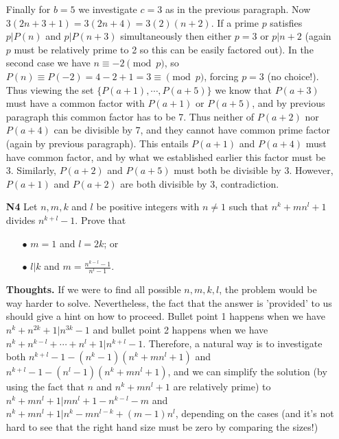 \documentclass[11pt,a4paper]{article}
\begin{document}
\begin{itemize}
Finally for $b=5$ we investigate $c=3$ as in the previous paragraph. 
Now $3(2n+3+1)=3(2n+4)=3(2)(n+2)$. 
If a prime $p$ satisfies $p|P(n)$ and $p|P(n+3)$ simultaneously then either $p=3$ or $p|n+2$ 
(again $p$ must be relatively prime to 2 so this can be easily factored out). 
In the second case we have $n\equiv -2\pmod{p}$, 
so $P(n)\equiv P(-2)=4-2+1=3\equiv\pmod{p}$, forcing $p=3$ (no choice!). 
Thus viewing the set $\{P(a+1), \cdots , P(a+5)\}$ 
we know that $P(a+3)$ must have a common factor with $P(a+1)$ or $P(a+5)$, and by previous paragraph this common factor has to be 7. 
Thus neither of $P(a+2)$ nor $P(a+4)$ can be divisible by 7, and they cannot have common prime factor (again by previous paragraph). 
This entails $P(a+1)$ and $P(a+4)$ must have common factor, and by what we established earlier this factor must be 3. 
Similarly, $P(a+2)$ and $P(a+5)$ must both be divisible by 3. 
However, $P(a+1)$ and $P(a+2)$ are both divisible by 3, contradiction. 


\newpage

\item[\textbf{N4}]
Let $n, m, k$ and $l$ be positive integers with $n \neq 1$ such that $n^k + mn^l + 1$ divides $n^{k+l} - 1$. Prove that
\begin{itemize}
\item[$\bullet$] $m = 1$ and $l = 2k$; or
\item[$\bullet$] $l|k$ and $m = \frac{n^{k-l}-1}{n^l-1}$.
\end{itemize}

\textbf{Thoughts.} If we were to find all possible $n, m , k , l$, the problem would be way harder to solve. Nevertheless, the fact that the answer is 'provided' to us should give a hint on how to proceed. Bullet point 1 happens when we have $n^k+n^{2k}+1|n^{3k}-1$ and bullet point 2 happens when we have $n^k+n^{k-l}+\cdots +n^l+1|n^{k+l}-1$. Therefore, a natural way is to investigate both $n^{k+l}-1-(n^k-1)(n^k+mn^l+1)$ and $n^{k+l}-1-(n^l-1)(n^k+mn^l+1)$, and we can simplify the solution (by using the fact that $n$ and $n^k+mn^l+1$ are relatively prime) to $n^k+mn^l+1|mn^{l}+1-n^{k-l}-m$ and $n^k+mn^l+1|n^k-mn^{l-k}+(m-1)n^l$, depending on the cases (and it's not hard to see that the right hand size must be zero by comparing the sizes!)


\end{itemize}
\end{document}
